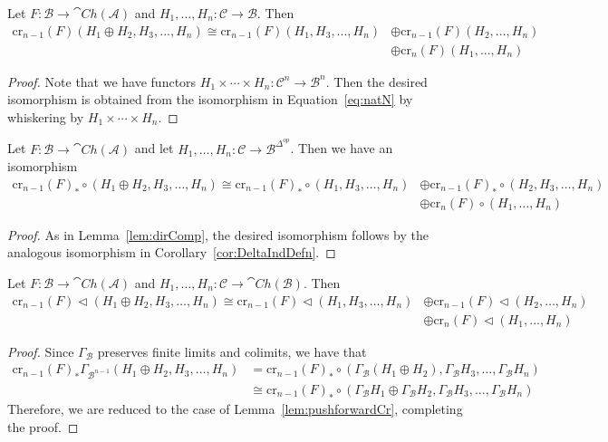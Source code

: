 \begin{lem}[label=lem:dirComp]
    Let $F:\mathcal{B}\to \cat{Ch}(\mathcal{A})$ and $H_1,...,H_n:\mathcal{C}\to \mathcal{B}$. Then 
    \begin{align*}
        \text{cr}_{n-1}(F)(H_1\oplus H_2,H_3,...,H_n) \cong \text{cr}_{n-1}(F)(H_1,H_3,...,H_n)&\oplus \text{cr}_{n-1}(F)(H_2,...,H_n) \\
        &\oplus \text{cr}_n(F)(H_1,...,H_n) 
    \end{align*}
\end{lem}
\begin{proof}
    Note that we have functors $H_1\times \cdots \times H_n:\mathcal{C}^n\to \mathcal{B}^n$. Then the desired isomorphism is obtained from the isomorphism in Equation~\eqref{eq:natN} by whiskering by $H_1\times \cdots \times H_n$.
\end{proof}

\begin{lem}[label=lem:pushforwardCr]
    Let $F:\mathcal{B}\to \cat{Ch}(\mathcal{A})$ and let $H_1,\ldots,H_n:\mathcal{C}\to \mathcal{B}^{\Delta^{op}}$. Then we have an isomorphism 
    \begin{align*}
        \text{cr}_{n-1}(F)_*\circ (H_1\oplus H_2,H_3,\ldots,H_n) \cong \text{cr}_{n-1}(F)_*\circ (H_1,H_3,\ldots,H_n)&\oplus \text{cr}_{n-1}(F)_*\circ (H_2,H_3,\ldots,H_n) \\
        &\oplus \text{cr}_n(F)\circ (H_1,\ldots,H_n)
    \end{align*}
\end{lem}
\begin{proof}
    As in Lemma~\ref{lem:dirComp}, the desired isomorphism follows by the analogous isomorphism in Corollary~\ref{cor:DeltaIndDefn}.
\end{proof}

\begin{lem}[label=lem:dirCompLhd]
    Let $F:\mathcal{B}\to \cat{Ch}(\mathcal{A})$ and $H_1,\ldots,H_n:\mathcal{C}\to \cat{Ch}(\mathcal{B})$. Then 
    \begin{align*}
        \text{cr}_{n-1}(F)\lhd (H_1\oplus H_2,H_3,\ldots,H_n) \cong \text{cr}_{n-1}(F)\lhd (H_1,H_3,\ldots,H_n)&\oplus \text{cr}_{n-1}(F)\lhd (H_2,\ldots,H_n) \\
        &\oplus \text{cr}_n(F)\lhd (H_1,\ldots,H_n) 
    \end{align*}
\end{lem}
\begin{proof}
    Since $\Gamma_\mathcal{B}$ preserves finite limits and colimits, we have that 
    \begin{align*}
        \text{cr}_{n-1}(F)_*\Gamma_{\mathcal{B}^{n-1}}(H_1\oplus H_2,H_3,\ldots,H_n) &= \text{cr}_{n-1}(F)_*\circ (\Gamma_\mathcal{B}(H_1\oplus H_2),\Gamma_\mathcal{B}H_3,\ldots,\Gamma_\mathcal{B}H_n) \\
        &\cong  \text{cr}_{n-1}(F)_*\circ (\Gamma_\mathcal{B}H_1\oplus \Gamma_\mathcal{B}H_2,\Gamma_\mathcal{B}H_3,\ldots,\Gamma_\mathcal{B}H_n) 
    \end{align*}
    Therefore, we are reduced to the case of Lemma~\ref{lem:pushforwardCr}, completing the proof.
\end{proof}

